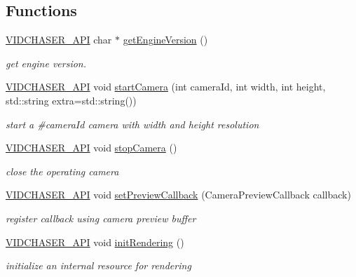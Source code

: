 \subsection*{Functions}
\begin{DoxyCompactItemize}
\item 
\hyperlink{_vid_chaser_a_p_i_8h_abe868bb94e22f611aece5087695f9ef3}{V\+I\+D\+C\+H\+A\+S\+E\+R\+\_\+\+A\+PI} char $\ast$ \hyperlink{namespace_vid_chaser_a351a56150e8d7cb4a2eb78a5332f6efc}{get\+Engine\+Version} ()
\begin{DoxyCompactList}\small\item\em get engine version. \end{DoxyCompactList}\item 
\hyperlink{_vid_chaser_a_p_i_8h_abe868bb94e22f611aece5087695f9ef3}{V\+I\+D\+C\+H\+A\+S\+E\+R\+\_\+\+A\+PI} void \hyperlink{namespace_vid_chaser_a9382813c29f7bf8b97fdc9f6e2e9b51d}{start\+Camera} (int camera\+Id, int width, int height, std\+::string extra=std\+::string())
\begin{DoxyCompactList}\small\item\em start a \#camera\+Id camera with width and height resolution \end{DoxyCompactList}\item 
\hyperlink{_vid_chaser_a_p_i_8h_abe868bb94e22f611aece5087695f9ef3}{V\+I\+D\+C\+H\+A\+S\+E\+R\+\_\+\+A\+PI} void \hyperlink{namespace_vid_chaser_ad7ef05eaf00e73b7f35f760e59c5ecca}{stop\+Camera} ()
\begin{DoxyCompactList}\small\item\em close the operating camera \end{DoxyCompactList}\item 
\hyperlink{_vid_chaser_a_p_i_8h_abe868bb94e22f611aece5087695f9ef3}{V\+I\+D\+C\+H\+A\+S\+E\+R\+\_\+\+A\+PI} void \hyperlink{namespace_vid_chaser_acb17083d4c7121491e9563358d3e018f}{set\+Preview\+Callback} (Camera\+Preview\+Callback callback)
\begin{DoxyCompactList}\small\item\em register callback using camera preview buffer \end{DoxyCompactList}\item 
\hyperlink{_vid_chaser_a_p_i_8h_abe868bb94e22f611aece5087695f9ef3}{V\+I\+D\+C\+H\+A\+S\+E\+R\+\_\+\+A\+PI} void \hyperlink{namespace_vid_chaser_a563757135fd48e2a0c9b14349271c6ac}{init\+Rendering} ()
\begin{DoxyCompactList}\small\item\em initialize an internal resource for rendering \end{DoxyCompactList}\item 

\end{DoxyCompactItemize}
